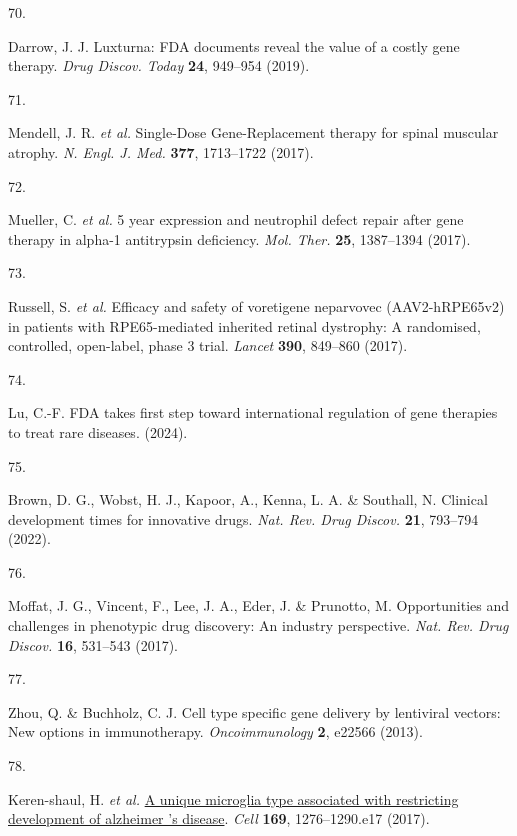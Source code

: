 \documentclass[
]{article}
\newlength{\cslhangindent}
\newlength{\csllabelwidth}
\newenvironment{CSLReferences}[2] %
 {\begin{list}{}{%
  \setlength{\itemindent}{0pt}
  \setlength{\leftmargin}{0pt}
  \setlength{\parsep}{0pt}
  \ifodd #1
   \setlength{\leftmargin}{\cslhangindent}
   \setlength{\itemindent}{-1\cslhangindent}
  \fi
  \setlength{\itemsep}{#2\baselineskip}}}
 {\end{list}}
\newcommand{\CSLLeftMargin}[1]{\parbox[t]{\csllabelwidth}{\strut#1\strut}}
\newcommand{\CSLRightInline}[1]{\parbox[t]{\linewidth - \csllabelwidth}{\strut#1\strut}}
\begin{document}
\begin{CSLReferences}{0}{0}
\CSLLeftMargin{70. }%
\CSLRightInline{Darrow, J. J. Luxturna: {FDA} documents reveal the value
of a costly gene therapy. \emph{Drug Discov. Today} \textbf{24},
949--954 (2019).}

\CSLLeftMargin{71. }%
\CSLRightInline{Mendell, J. R. \emph{et al.} {Single-Dose}
{Gene-Replacement} therapy for spinal muscular atrophy. \emph{N. Engl.
J. Med.} \textbf{377}, 1713--1722 (2017).}

\CSLLeftMargin{72. }%
\CSLRightInline{Mueller, C. \emph{et al.} 5 year expression and
neutrophil defect repair after gene therapy in alpha-1 antitrypsin
deficiency. \emph{Mol. Ther.} \textbf{25}, 1387--1394 (2017).}

\CSLLeftMargin{73. }%
\CSLRightInline{Russell, S. \emph{et al.} Efficacy and safety of
voretigene neparvovec ({AAV2-hRPE65v2}) in patients with
{RPE65-mediated} inherited retinal dystrophy: A randomised, controlled,
open-label, phase 3 trial. \emph{Lancet} \textbf{390}, 849--860 (2017).}

\CSLLeftMargin{74. }%
\CSLRightInline{Lu, C.-F. {FDA} takes first step toward international
regulation of gene therapies to treat rare diseases. (2024).}

\CSLLeftMargin{75. }%
\CSLRightInline{Brown, D. G., Wobst, H. J., Kapoor, A., Kenna, L. A. \&
Southall, N. Clinical development times for innovative drugs. \emph{Nat.
Rev. Drug Discov.} \textbf{21}, 793--794 (2022).}

\CSLLeftMargin{76. }%
\CSLRightInline{Moffat, J. G., Vincent, F., Lee, J. A., Eder, J. \&
Prunotto, M. Opportunities and challenges in phenotypic drug discovery:
An industry perspective. \emph{Nat. Rev. Drug Discov.} \textbf{16},
531--543 (2017).}

\CSLLeftMargin{77. }%
\CSLRightInline{Zhou, Q. \& Buchholz, C. J. Cell type specific gene
delivery by lentiviral vectors: New options in immunotherapy.
\emph{Oncoimmunology} \textbf{2}, e22566 (2013).}

\CSLLeftMargin{78. }%
\CSLRightInline{Keren-shaul, H. \emph{et al.}
\href{https://doi.org/10.1016/j.cell.2017.05.018}{A unique microglia
type associated with restricting development of alzheimer 's disease}.
\emph{Cell} \textbf{169}, 1276--1290.e17 (2017).}


\end{CSLReferences}
\end{document}
